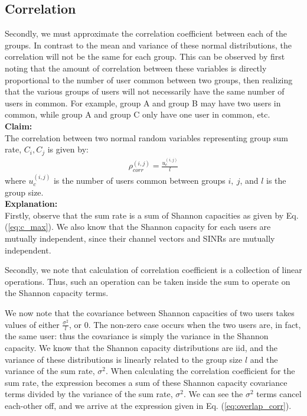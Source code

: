 \subsection{Correlation}
Secondly, we must approximate the correlation coefficient between each of the groups. In contrast to the mean and variance of these normal distributions, the correlation will not be the same for each group. This can be observed by first noting that the amount of correlation between these variables is directly proportional to the number of user common between two groups, then realizing that the various groups of users will not necessarily have the same number of users in common. For example, group A and group B may have two users in common, while group A and group C only have one user in common, etc.\\
\textbf{Claim:}\\ The correlation between two normal random variables representing group sum rate, $C_i,C_j$ is given by:
\begin{equation}\label{eq:overlap_corr}
    \begin{aligned}
        \rho_{corr}^{(i,j)} = \frac{u_{c}^{(i,j)}}{l}
    \end{aligned}
\end{equation}
where $u_{c}^{(i,j)}$ is the number of users common between groups $i,\ j$, and $l$ is the group size. \\
\textbf{Explanation:}\\ 
Firstly, observe that the sum rate is a sum of Shannon capacities as given by Eq. (\ref{eq:c_max}). We also know that the Shannon capacity for each users are mutually independent, since their channel vectors and SINRs are mutually independent.

Secondly, we note that calculation of correlation coefficient is a collection of linear operations. Thus, such an operation can be taken inside the sum to operate on the Shannon capacity terms.

We now note that the covariance between Shannon capacities of two users takes values of either $\frac{\sigma^2}{l}$, or $0$. The non-zero case occurs when the two users are, in fact, the same user: thus the covariance is simply the variance in the Shannon capacity. We know that the Shannon capacity distributions are iid, and the variance of these distributions is linearly related to the group size $l$ and the variance of the sum rate, $\sigma^2$. When calculating the correlation coefficient for the sum rate, the expression becomes a sum of these Shannon capacity covariance terms divided by the variance of the sum rate, $\sigma^2$. We can see the $\sigma^2$ terms cancel each-other off, and we arrive at the expression given in Eq. (\ref{eq:overlap_corr}).

